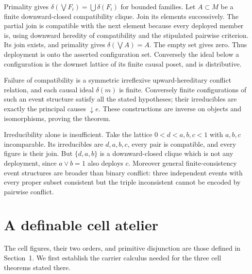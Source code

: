 \documentclass[11pt,a4paper]{article}
\theoremstyle{definition}
\begin{document}
Primality gives $\delta(\bigvee F_i)=\bigcup\delta(F_i)$ for bounded families. Let $A\subset M$ be a finite downward-closed compatibility clique. Join its elements successively. The partial join is compatible with the next element because every deployed member is, using downward heredity of compatibility and the stipulated pairwise criterion. Its join exists, and primality gives $\delta(\bigvee A)=A$. The empty set gives zero. Thus deployment is onto the asserted configuration set. Conversely the ideal below a configuration is the downset lattice of its finite causal poset, and is distributive.

Failure of compatibility is a symmetric irreflexive upward-hereditary conflict relation, and each causal ideal $\delta(m)$ is finite. Conversely finite configurations of such an event structure satisfy all the stated hypotheses; their irreducibles are exactly the principal causes $\downarrow e$. These constructions are inverse on objects and isomorphisms, proving the theorem.

Irreducibility alone is insufficient. Take the lattice $0<d<a,b,c<1$ with $a,b,c$ incomparable. Its irreducibles are $d,a,b,c$, every pair is compatible, and every figure is their join. But $\{d,a,b\}$ is a downward-closed clique which is not any deployment, since $a\vee b=1$ also deploys $c$. Moreover general finite-consistency event structures are broader than binary conflict: three independent events with every proper subset consistent but the triple inconsistent cannot be encoded by pairwise conflict.



\section{A definable cell atelier}\label{sec:cellatelier}
The cell figures, their two orders, and primitive disjunction are those defined in Section~1. We first establish the carrier calculus needed for the three cell theorems stated there.
\end{document}

